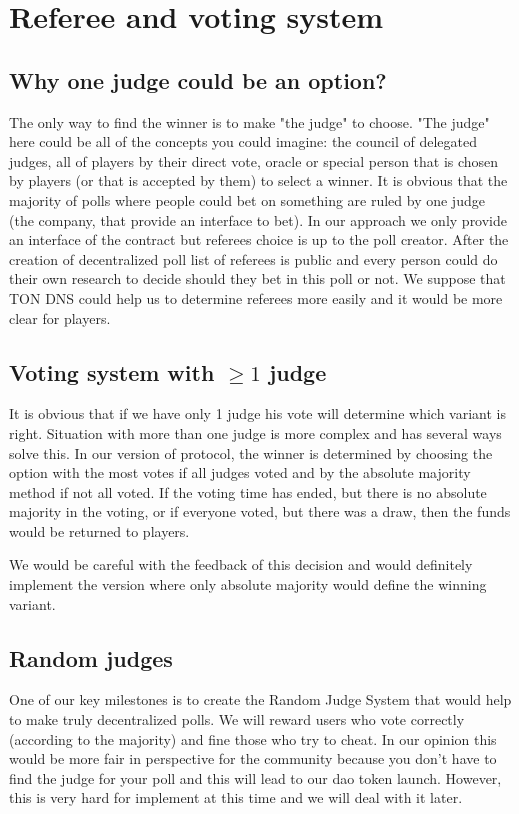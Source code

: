 \documentclass [12pt] {article}
\begin{document}
	\section{Referee and voting system}
	\subsection{Why one judge could be an option?}
	The only way to find the winner is to make "the judge" to choose. "The judge" here could be all of the concepts you could imagine: the council of delegated judges, all of players by their direct vote, oracle or special person that is chosen by players (or that is accepted by them) to select a winner. It is obvious that the majority of polls where people could bet on something are ruled by one judge (the company, that provide an interface to bet). In our approach we only provide an interface of the contract but referees choice is up to the poll creator. After the creation of decentralized poll list of referees is public and every person could do their own research to decide should they bet in this poll or not. We suppose that TON DNS could help us to determine referees more easily and it would be more clear for players.
	\subsection{Voting system with $\ge 1$ judge}
	It is obvious that if we have only 1 judge his vote will determine which variant is right. Situation with more than one judge is more complex and has several ways solve this. In our version of protocol, the winner is determined by choosing the option with the most votes if all judges voted and by the absolute majority method if not all voted. If the voting time has ended, but there is no absolute majority in the voting, or if everyone voted, but there was a draw, then the funds would be returned to players. 
	
	We would be careful with the feedback of this decision and would definitely implement the version where only absolute majority would define the winning variant. 
	\subsection{Random judges}
	One of our key milestones is to create the Random Judge System that would help to make truly decentralized polls. We will reward users who vote correctly (according to the majority) and fine those who try to cheat. In our opinion this would be more fair in perspective for the community because you don't have to find the judge for your poll and this will lead to our dao token launch. However, this is very hard for implement at this time and we will deal with it later.
	
		
\end{document}

